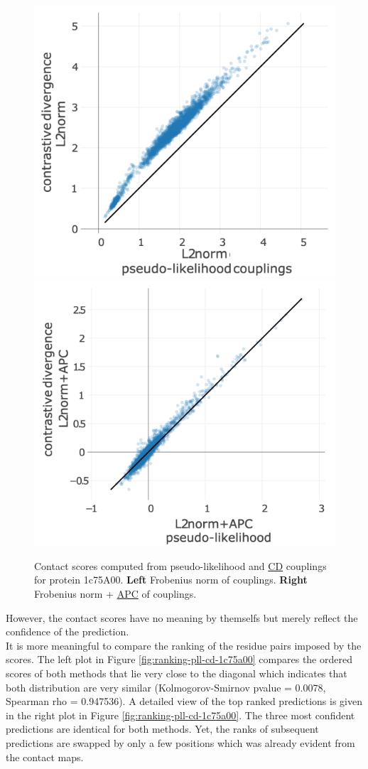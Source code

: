 \documentclass[11pt,a4paper,twoside]{book}
\theoremstyle{definition}
\theoremstyle{definition}
\theoremstyle{remark}
\begin{document}
\begin{figure}

{\centering \includegraphics[width=0.48\linewidth]{img/full_likelihood/comparing_couplings/1c75A00/scatter_for_pseudo-likelihoodvs_contrastive_divergence_1c75A00} \includegraphics[width=0.48\linewidth]{img/full_likelihood/comparing_couplings/1c75A00/scatter_for_pseudo-likelihoodvs_contrastive_divergence_apc_1c75A00} 

}

\caption{Contact scores computed from
pseudo-likelihood and \protect\hyperlink{abbrev}{CD} couplings for
protein 1c75A00. \textbf{Left} Frobenius norm of couplings.
\textbf{Right} Frobenius norm + \protect\hyperlink{abbrev}{APC} of
couplings.}\label{fig:scatter-plots-1c75a00}
\end{figure}

However, the contact scores have no meaning by themselfs but merely
reflect the confidence of the prediction.\\
It is more meaningful to compare the ranking of the residue pairs
imposed by the scores. The left plot in Figure
\ref{fig:ranking-pll-cd-1c75a00} compares the ordered scores of both
methods that lie very close to the diagonal which indicates that both
distribution are very similar (Kolmogorov-Smirnov pvalue = 0.0078,
Spearman rho = 0.947536). A detailed view of the top ranked predictions
is given in the right plot in Figure \ref{fig:ranking-pll-cd-1c75a00}.
The three most confident predictions are identical for both methods.
Yet, the ranks of subsequent predictions are swapped by only a few
positions which was already evident from the contact maps.
\end{document}
